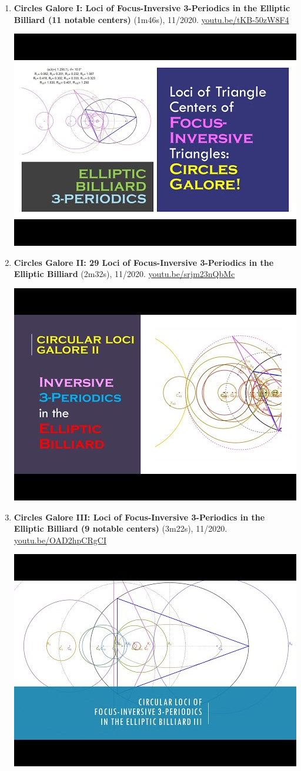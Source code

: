 \documentclass[12pt]{article}
\begin{document}
\begin{enumerate}[resume]
% 
\item \textbf{Circles Galore I: Loci of Focus-Inversive 3-Periodics in the Elliptic Billiard (11 notable centers)} (1m46s), 11/2020. \href{https://youtu.be/tKB-50zW8F4}{\url{youtu.be/tKB-50zW8F4}}
\begin{center}\includegraphics[width=.5\textwidth]{pics/tKB-50zW8F4.jpg}\end{center}
% 
\item \textbf{Circles Galore II: 29 Loci of Focus-Inversive 3-Periodics in the Elliptic Billiard} (2m32s), 11/2020. \href{https://youtu.be/srjm23nQbMc}{\url{youtu.be/srjm23nQbMc}}
\begin{center}\includegraphics[width=.5\textwidth]{pics/srjm23nQbMc.jpg}\end{center}
% 
\item \textbf{Circles Galore III: Loci of Focus-Inversive 3-Periodics in the Elliptic Billiard (9 notable centers)} (3m22s), 11/2020. \href{https://youtu.be/OAD2hpCRgCI}{\url{youtu.be/OAD2hpCRgCI}}
\begin{center}\includegraphics[width=.5\textwidth]{pics/OAD2hpCRgCI.jpg}\end{center}

\end{enumerate}
\end{document}
